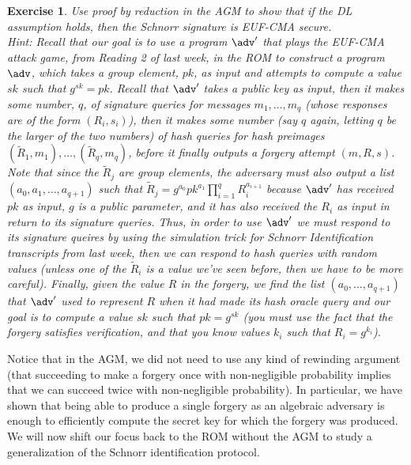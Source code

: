 \documentclass[12pt]{article}
\newtheorem{exercise}{Exercise}
\theoremstyle{definition}
\theoremstyle{remark}
\theoremstyle{definition}
\begin{document}
\begin{exercise}
Use proof by reduction in the AGM to show that if the DL assumption holds, then the Schnorr signature is EUF-CMA secure.\\

Hint: Recall that our goal is to use a program $\adv'$ that plays the EUF-CMA attack game, from Reading 2 of last week, in the ROM to construct a program $\adv$, which takes a group element, $pk$, as input and attempts to compute a value $sk$ such that $g^{sk} = pk$. Recall that $\adv'$ takes a public key as input, then it makes some number, $q$, of signature queries for messages $m_1, \ldots, m_q$ (whose responses are of the form $(R_i, s_i)$), then it makes some number (say $q$ again, letting $q$ be the larger of the two numbers) of hash queries for hash preimages $(\tilde{R}_1, m_1),\ldots, (\tilde{R}_q, m_q)$, before it finally outputs a forgery attempt $(m, R, s)$. Note that since the $\tilde{R}_j$ are group elements, the adversary must also output a list $(a_0, a_1, \ldots, a_{q+1})$ such that $\tilde{R}_j = g^{a_0}pk^{a_1}\prod_{i=1}^qR_i^{a_{i+1}}$ because $\adv'$ has received $pk$ as input, $g$ is a public parameter, and it has also received the $R_i$ as input in return to its signature queries. Thus, in order to use $\adv'$ we must respond to its signature queires by using the simulation trick for Schnorr Identification transcripts from last week, then we can respond to hash queries with random values (unless one of the $\tilde{R}_i$ is a value we've seen before, then we have to be more careful). Finally, given the value $R$ in the forgery, we find the list $(a_0, \ldots, a_{q+1})$ that $\adv'$ used to represent $R$ when it had made its hash oracle query and our goal is to compute a value $sk$ such that $pk = g^{sk}$ (you must use the fact that the forgery satisfies verification, and that you know values $k_i$ such that $R_i = g^{k_i}$).
\end{exercise}

Notice that in the AGM, we did not need to use any kind of rewinding argument (that succeeding to make a forgery once with non-negligible probability implies that we can succeed twice with non-negligible probability). In particular, we have shown that being able to produce a single forgery as an algebraic adversary is enough to efficiently compute the secret key for which the forgery was produced.\\

We will now shift our focus back to the ROM without the AGM to study a generalization of the Schnorr identification protocol.
\end{document}
